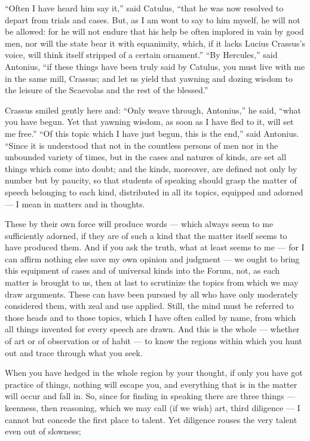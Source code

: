  ``Often I have heard him say it,'' said Catulus, ``that he was now resolved to depart from trials and cases. But, as I am wont to say to him myself, he will not be allowed: for he will not endure that his help be often implored in vain by good men, nor will the state bear it with equanimity, which, if it lacks Lucius Crassus's voice, will think itself stripped of a certain ornament.'' ``By Hercules,'' said Antonius, ``if these things have been truly said by Catulus, you must live with me in the same mill, Crassus; and let us yield that yawning and dozing wisdom to the leisure of the Scaevolas and the rest of the blessed.''

 Crassus smiled gently here and: ``Only weave through, Antonius,'' he said, ``what you have begun. Yet that yawning wisdom, as soon as I have fled to it, will set me free.'' ``Of this topic which I have just begun, this is the end,'' said Antonius. ``Since it is understood that not in the countless persons of men nor in the unbounded variety of times, but in the cases and natures of kinds, are set all things which come into doubt; and the kinds, moreover, are defined not only by number but by paucity, so that students of speaking should grasp the matter of speech belonging to each kind, distributed in all its topics, equipped and adorned — I mean in matters and in thoughts.

 These by their own force will produce words — which always seem to me sufficiently adorned, if they are of such a kind that the matter itself seems to have produced them. And if you ask the truth, what at least seems to me — for I can affirm nothing else save my own opinion and judgment — we ought to bring this equipment of cases and of universal kinds into the Forum, not, as each matter is brought to us, then at last to scrutinize the topics from which we may draw arguments. These can have been pursued by all who have only moderately considered them, with zeal and use applied. Still, the mind must be referred to those heads and to those topics, which I have often called by name, from which all things invented for every speech are drawn. And this is the whole — whether of art or of observation or of habit — to know the regions within which you hunt out and trace through what you seek.

 When you have hedged in the whole region by your thought, if only you have got practice of things, nothing will escape you, and everything that is in the matter will occur and fall in. So, since for finding in speaking there are three things — keenness, then reasoning, which we may call (if we wish) art, third diligence — I cannot but concede the first place to talent. Yet diligence rouses the very talent even out of slowness;

